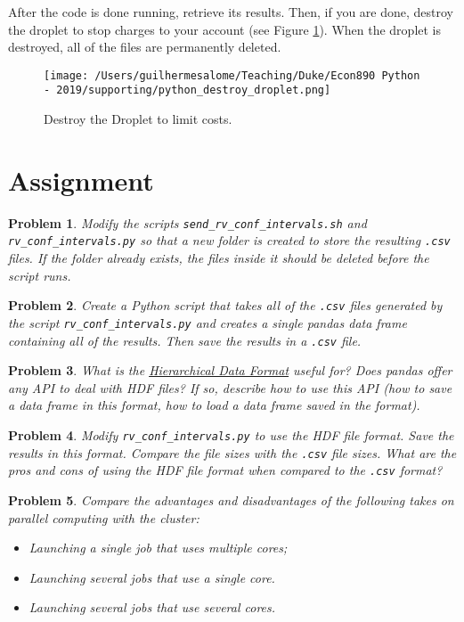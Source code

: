 \documentclass[12pt, a4paper]{article}
\newtheorem{problem}{Problem}
\begin{document}
After the code is done running, retrieve its results.
Then, if you are done, destroy the droplet to stop charges to your account (see Figure \ref{fig:orgb6ad212}).
When the droplet is destroyed, all of the files are permanently deleted.

\begin{figure}[H]
\centering
\texttt{[image: /Users/guilhermesalome/Teaching/Duke/Econ890 Python - 2019/supporting/python\_destroy\_droplet.png]}
\caption{\label{fig:orgb6ad212}
Destroy the Droplet to limit costs.}
\end{figure}

\section{Assignment}
\label{sec:orgacf567d}
\begin{problem}
Modify the scripts \texttt{send\_rv\_conf\_intervals.sh} and \texttt{rv\_conf\_intervals.py} so that a new folder is created to store the resulting \texttt{.csv} files.
If the folder already exists, the files inside it should be deleted before the script runs.
\end{problem}

\begin{problem}
Create a Python script that takes all of the \texttt{.csv} files generated by the script \texttt{rv\_conf\_intervals.py} and creates a single pandas data frame containing all of the results. Then save the results in a \texttt{.csv} file.
\end{problem}

\begin{problem}
What is the \href{https://en.wikipedia.org/wiki/Hierarchical\_Data\_Format}{Hierarchical Data Format} useful for?
Does pandas offer any API to deal with HDF files?
If so, describe how to use this API (how to save a data frame in this format, how to load a data frame saved in the format).
\end{problem}

\begin{problem}
Modify \texttt{rv\_conf\_intervals.py} to use the HDF file format.
Save the results in this format.
Compare the file sizes with the \texttt{.csv} file sizes.
What are the pros and cons of using the HDF file format when compared to the \texttt{.csv} format?
\end{problem}

\begin{problem}
Compare the advantages and disadvantages of the following takes on parallel computing with the cluster:
\begin{itemize}
\item Launching a single job that uses multiple cores;
\item Launching several jobs that use a single core.
\item Launching several jobs that use several cores.
\end{itemize}
\end{problem}
\end{document}
